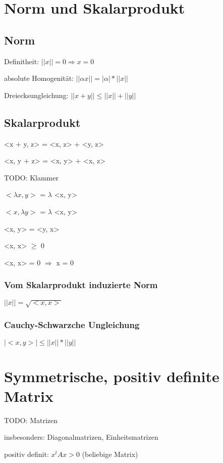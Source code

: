 \documentclass[12pt,a4paper]{article} %
\begin{document}
	\tableofcontents %
	\newpage %
	\section{Norm und Skalarprodukt}
	
	
	\subsection{Norm}
	Definitheit: $||x|| = 0 \Rightarrow x = 0$
		
	absolute Homogenität: $||\alpha x|| = |\alpha| * ||x||$
	
	Dreiecksungleichung: $||x + y|| \le ||x|| + ||y||$
	
	\subsection{Skalarprodukt}
	<x + y, z> = <x, z> + <y, z>
	
	<x, y + z> = <x, y> + <x, z>
	
	TODO: Klammer
	
	$<\lambda x, y>$ = $\lambda$ <x, y>
	
	$<x, \lambda y>$ = $\lambda$ <x, y>
	
	<x, y> = <y, x>
	
	<x, x> $\ge$ 0
	
	<x, x> = 0 $\Rightarrow$ x = 0
	
	
	\subsubsection{Vom Skalarprodukt induzierte Norm}
	$||x|| = \sqrt{<x, x>}$
	
	\subsubsection{Cauchy-Schwarzche Ungleichung}
	$|<x, y>| \le ||x||*||y||$
		
	\newpage
	
	\section{Symmetrische, positiv definite Matrix}
	TODO: Matrizen
	
	insbesonders: Diagonalmatrizen, Einheitsmatrizen
	
	positiv definit: $x^t Ax > 0$ (beliebige Matrix)
	
\end{document}
